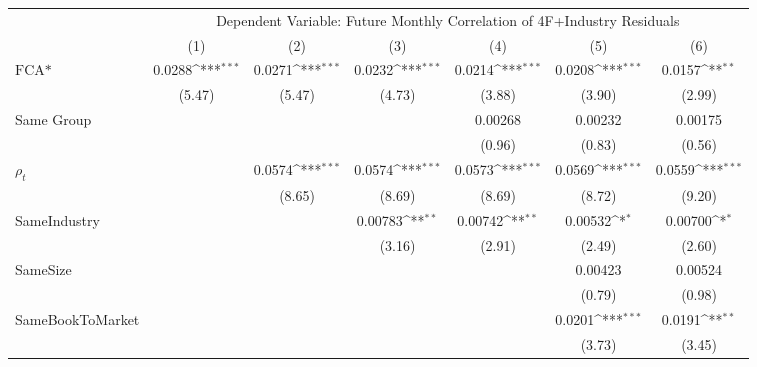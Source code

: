 {
\def\sym#1{\ifmmode^{#1}\else\(^{#1}\)\fi}
\begin{tabular}{l*{6}{c}}
\hline\hline
                &\multicolumn{6}{c}{Dependent Variable: Future Monthly Correlation of 4F+Industry Residuals}                      \\\cmidrule(lr){2-7}
                &\multicolumn{1}{c}{(1)}         &\multicolumn{1}{c}{(2)}         &\multicolumn{1}{c}{(3)}         &\multicolumn{1}{c}{(4)}         &\multicolumn{1}{c}{(5)}         &\multicolumn{1}{c}{(6)}         \\
\hline
$ \text{FCA*} $ &   0.0288\sym{***}&   0.0271\sym{***}&   0.0232\sym{***}&   0.0214\sym{***}&   0.0208\sym{***}&   0.0157\sym{**} \\
                &   (5.47)         &   (5.47)         &   (4.73)         &   (3.88)         &   (3.90)         &   (2.99)         \\
[1em]
Same Group      &                  &                  &                  &  0.00268         &  0.00232         &  0.00175         \\
                &                  &                  &                  &   (0.96)         &   (0.83)         &   (0.56)         \\
[1em]
 $ {\rho_t} $   &                  &   0.0574\sym{***}&   0.0574\sym{***}&   0.0573\sym{***}&   0.0569\sym{***}&   0.0559\sym{***}\\
                &                  &   (8.65)         &   (8.69)         &   (8.69)         &   (8.72)         &   (9.20)         \\
[1em]
SameIndustry    &                  &                  &  0.00783\sym{**} &  0.00742\sym{**} &  0.00532\sym{*}  &  0.00700\sym{*}  \\
                &                  &                  &   (3.16)         &   (2.91)         &   (2.49)         &   (2.60)         \\
[1em]
SameSize        &                  &                  &                  &                  &  0.00423         &  0.00524         \\
                &                  &                  &                  &                  &   (0.79)         &   (0.98)         \\
[1em]
SameBookToMarket&                  &                  &                  &                  &   0.0201\sym{***}&   0.0191\sym{**} \\
                &                  &                  &                  &                  &   (3.73)         &   (3.45)         \\

\end{tabular}}
